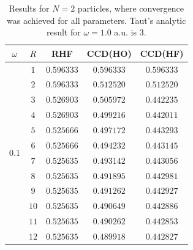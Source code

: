 \documentclass[
    a4paper, aps, twocolumn, floatfix, superscriptaddress,
    nofootinbib]{revtex4-1}
\newcommand{\1}{\mathds{1}}
\begin{document}
        \begin{table}
            \centering
            \caption{Results for $N = 2$ particles, where convergence was
            achieved for all parameters. Taut's\cite{taut1994two} analytic
            result for $\omega = 1.0$ a.u. is $3$.}
            \begin{ruledtabular}
                \begin{tabular}{c|c|ccc}
                    $\omega$ & $R$ & RHF & CCD(HO) & CCD(HF) \\
                    \hline
                               &  $1$  & $0.596333$ & $0.596333$ & $0.596333$ \\
                               &  $2$  & $0.596333$ & $0.512520$ & $0.512520$ \\
                               &  $3$  & $0.526903$ & $0.505972$ & $0.442235$ \\
                               &  $4$  & $0.526903$ & $0.499216$ & $0.442011$ \\
                               &  $5$  & $0.525666$ & $0.497172$ & $0.443293$ \\
        \multirow{2}{*}{$0.1$} &  $6$  & $0.525666$ & $0.494232$ & $0.443145$ \\
                               &  $7$  & $0.525635$ & $0.493142$ & $0.443056$ \\
                               &  $8$  & $0.525635$ & $0.491895$ & $0.442981$ \\
                               &  $9$  & $0.525635$ & $0.491262$ & $0.442927$ \\
                               &  $10$ & $0.525635$ & $0.490649$ & $0.442886$ \\
                               &  $11$ & $0.525635$ & $0.490262$ & $0.442853$ \\
                               &  $12$ & $0.525635$ & $0.489918$ & $0.442827$ \\
                    \hline


\end{tabular}
\end{ruledtabular}
\end{table}
\end{document}
